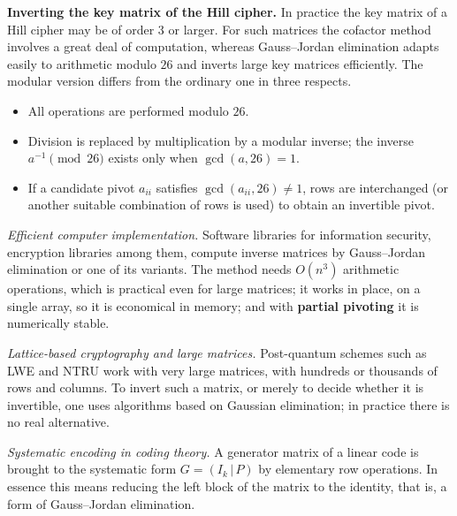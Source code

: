 \textbf{Inverting the key matrix of the Hill cipher.}
In practice the key matrix of a Hill cipher may be of order $3$ or larger. For
such matrices the cofactor method involves a great deal of computation, whereas
Gauss–Jordan elimination adapts easily to arithmetic modulo $26$ and inverts
large key matrices efficiently. The modular version differs from the ordinary one
in three respects.
\begin{itemize}[leftmargin=1.3em]
\item All operations are performed modulo $26$.
\item Division is replaced by multiplication by a modular inverse; the inverse
$a^{-1}\pmod{26}$ exists only when $\gcd(a,26)=1$.
\item If a candidate pivot $a_{ii}$ satisfies $\gcd(a_{ii},26)\neq 1$, rows are
interchanged (or another suitable combination of rows is used) to obtain an
invertible pivot.
\end{itemize}
\emph{Efficient computer implementation.}
Software libraries for information security, encryption libraries among them,
compute inverse matrices by Gauss–Jordan elimination or one of its variants. The
method needs $O(n^3)$ arithmetic operations, which is practical even for large
matrices; it works in place, on a single array, so it is economical in memory;
and with \textbf{partial pivoting} it is numerically stable.

\emph{Lattice-based cryptography and large matrices.}
Post-quantum schemes such as LWE and NTRU work with very large matrices, with
hundreds or thousands of rows and columns. To invert such a matrix, or merely to
decide whether it is invertible, one uses algorithms based on Gaussian
elimination; in practice there is no real alternative.

\emph{Systematic encoding in coding theory.}
A generator matrix of a linear code is brought to the systematic form
$G = (I_k\,|\,P)$ by elementary row operations. In essence this means reducing the
left block of the matrix to the identity, that is, a form of Gauss–Jordan
elimination.
